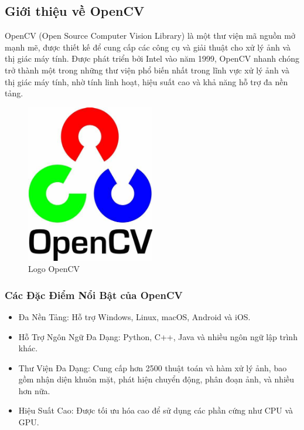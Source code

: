 \begin{flushleft}
    \subsection{Giới thiệu về OpenCV}
    OpenCV (Open Source Computer Vision Library) là một thư viện mã nguồn mở mạnh mẽ, được thiết kế để cung cấp các công cụ và giải thuật cho xử lý ảnh và thị giác máy tính. Được phát triển bởi Intel vào năm 1999, OpenCV nhanh chóng trở thành một trong những thư viện phổ biến nhất trong lĩnh vực xử lý ảnh và thị giác máy tính, nhờ tính linh hoạt, hiệu suất cao và khả năng hỗ trợ đa nền tảng.\\
    \begin{figure}[h]
        \centering
        \includegraphics[width=0.5\textwidth]{images/OIP.jpg}
        \caption{Logo OpenCV}\label{fig:logo_cv2}
    \end{figure}
    \subsubsection{Các Đặc Điểm Nổi Bật của OpenCV}
    \begin{itemize}
        \item Đa Nền Tảng: Hỗ trợ Windows, Linux, macOS, Android và iOS.
        \item Hỗ Trợ Ngôn Ngữ Đa Dạng: Python, C++, Java và nhiều ngôn ngữ lập trình khác.
        \item Thư Viện Đa Dạng: Cung cấp hơn 2500 thuật toán và hàm xử lý ảnh, bao gồm nhận diện khuôn mặt, phát hiện chuyển động, phân đoạn ảnh, và nhiều hơn nữa.
        \item Hiệu Suất Cao: Được tối ưu hóa cao để sử dụng các phần cứng như CPU và GPU.
    \end{itemize}

\end{flushleft}
